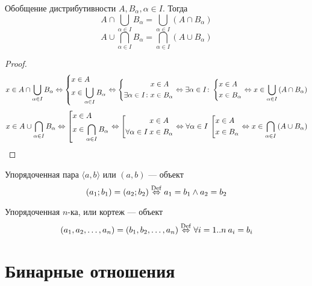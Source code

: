 \begin{theorem}{Обобщение дистрибутивности}
$ A, B_\alpha, \alpha \in I $.
Тогда 
$$ A \cap \bigcup_{\alpha \in I} B_\alpha = \bigcup_{\alpha \in I} (A \cap B_\alpha) $$
$$ A \cup \bigcap_{\alpha \in I} B_\alpha = \bigcap_{\alpha \in I} (A \cup B_\alpha) $$
\end{theorem}
\begin{proof}
$$
x \in A \cap \bigcup_{\alpha \in I} B_{\alpha} \Leftrightarrow \left\{\begin{aligned}x &\in A \\ x &\in \bigcup_{\alpha \in I} B_{\alpha}\end{aligned}\right. \Leftrightarrow 
\left\{\begin{aligned} x &\in A \\ \exists \alpha \in I\colon x &\in B_\alpha \end{aligned}\right. \Leftrightarrow
\exists \alpha \in I\colon \left\{\begin{aligned} x &\in A \\ x &\in B_\alpha \end{aligned}\right.  
\Leftrightarrow x \in \bigcup_{\alpha \in I} \left(A \cap B_\alpha\right) 
$$
$$
x \in A \cup \bigcap_{\alpha \in I} B_{\alpha} \Leftrightarrow \left[\begin{aligned}x &\in A \\ x &\in \bigcap_{\alpha \in I} B_{\alpha}\end{aligned}\right. \Leftrightarrow 
\left[\begin{aligned} x &\in A \\ \forall \alpha \in I\: x &\in B_\alpha \end{aligned}\right. \Leftrightarrow
\forall \alpha \in I\: \left[\begin{aligned} x &\in A \\ x &\in B_\alpha \end{aligned}\right.  
\Leftrightarrow x \in \bigcap_{\alpha \in I} \left(A \cup B_\alpha\right) 
$$
\end{proof}

\begin{Def}
Упорядоченная пара $\langle a, b \rangle$ или $(a, b)$ --- объект
$$ (a_1; b_1) = (a_2; b_2) \stackrel{\mathrm{Def}}{\Leftrightarrow} a_1 = b_1 \land a_2 = b_2 $$
\end{Def}
\begin{Def}
Упорядоченная $n$-ка, или кортеж --- объект
$$ (a_1, a_2, \ldots, a_n) = (b_1, b_2, \ldots, a_n) \stackrel{\mathrm{Def}}{\Leftrightarrow} \forall i=1..n\: a_i = b_i $$
\end{Def}

\section{Бинарные отношения}

